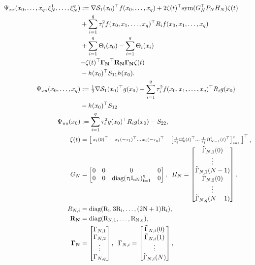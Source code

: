 \documentclass[12pt]{article}
\begin{document}
 {\footnotesize \begin{align*}
 \Psi_{xx}(x_0, \ldots,x_q,\xi^1_{N},\ldots,\xi^q_N)&:=\nabla\mathcal{S}_1(x_0)^\top f(x_0,\ldots,x_q)+  2\zeta(t)^\top\mathrm{sym}(G^\top_NP_N H_N)\zeta(t)\\
 &+\sum_{i=1}^q\tau_i^2 f(x_0,x_1,\ldots,x_q)^{\top} R_if(x_0,x_1,\ldots,x_q)\\
 &+ \sum_{i=1}^q \Theta_i(x_0)-\sum_{i=1}^q\Theta_i(x_i)\\
&{-\zeta(t)^\top \mathbf{\Gamma_N}^\top \mathbf{R_N}\mathbf{\Gamma_N}\zeta(t)}\\
&-h(x_0)^\top S_{11}h(x_0).
\\ 
  \Psi_{xu}(x_0,\ldots,x_q)&:=\tfrac12 \nabla\mathcal{S}_1(x_0)^\top g(x_0)+\sum_{i=1}^q \tau_i ^2f(x_0,x_1,\ldots,x_q)^\top R_i g(x_0)\\
  &-h(x_0)^\top S_{12}\\
  \Psi_{uu}(x_0)&:=\sum_{i=1}^q \tau_i^2g(x_0)^\top R_i g(x_0)-S_{22},\\
\zeta(t)&=\left[\begin{smallmatrix}x_t(0)^\top \quad x_t(-\tau_1)^\top \ldots\,  x_t(-\tau_q)^\top\quad \left[\frac{1}{\tau_i}\Omega_0^{i}(t)^\top \ldots\,  \frac{1}{\tau_i}\Omega_{N-1}^{i}(t)^\top\right]_{i=1}^q 
\end{smallmatrix}\right]^\top,\\
G_N&=\begin{bmatrix} 
0&0&0&0\\
  0& 0 & \rm diag( \tau_i I_{nN})_{i=1}^q&0 \end{bmatrix},\hspace{2mm} H_N=\begin{bmatrix}
\tilde \Gamma_{N,1}(0)\\ \vdots\\
\tilde \Gamma_{N,1}(N-1) \\
\tilde \Gamma_{N,2}(0)\\
\vdots
\\\tilde \Gamma_{N,q}(N-1) 
\end{bmatrix},\\
R_{N,i}&=\rm diag(R_i,3R_i, \ldots, (2N+1)R_i),\\
 \mathbf{R_N}&=\rm diag(R_{N,1}, \ldots, R_{N,q}),\\
\mathbf{\Gamma_N} &= \begin{bmatrix} \Gamma_{N,1} \\  \Gamma_{N,2} \\ \vdots \\ \Gamma_{N,q} \end{bmatrix},  \hspace{2mm} \Gamma_{N,i} = \begin{bmatrix} \tilde\Gamma_{N,i}(0) \\ \tilde \Gamma_{N,i}(1) \\ \vdots \\ \tilde\Gamma_{N,i}(N) \end{bmatrix},\\

\end{align*}}
\end{document}
